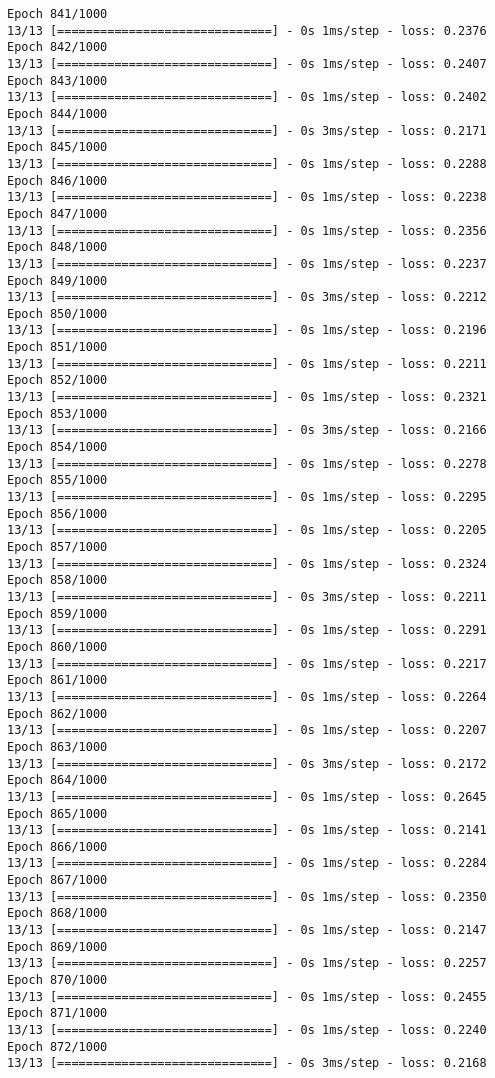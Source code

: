 \documentclass[11pt]{article}
\begin{document}
\begin{Verbatim}[commandchars=\\\{\}]
Epoch 841/1000
13/13 [==============================] - 0s 1ms/step - loss: 0.2376
Epoch 842/1000
13/13 [==============================] - 0s 1ms/step - loss: 0.2407
Epoch 843/1000
13/13 [==============================] - 0s 1ms/step - loss: 0.2402
Epoch 844/1000
13/13 [==============================] - 0s 3ms/step - loss: 0.2171
Epoch 845/1000
13/13 [==============================] - 0s 1ms/step - loss: 0.2288
Epoch 846/1000
13/13 [==============================] - 0s 1ms/step - loss: 0.2238
Epoch 847/1000
13/13 [==============================] - 0s 1ms/step - loss: 0.2356
Epoch 848/1000
13/13 [==============================] - 0s 1ms/step - loss: 0.2237
Epoch 849/1000
13/13 [==============================] - 0s 3ms/step - loss: 0.2212
Epoch 850/1000
13/13 [==============================] - 0s 1ms/step - loss: 0.2196
Epoch 851/1000
13/13 [==============================] - 0s 1ms/step - loss: 0.2211
Epoch 852/1000
13/13 [==============================] - 0s 1ms/step - loss: 0.2321
Epoch 853/1000
13/13 [==============================] - 0s 3ms/step - loss: 0.2166
Epoch 854/1000
13/13 [==============================] - 0s 1ms/step - loss: 0.2278
Epoch 855/1000
13/13 [==============================] - 0s 1ms/step - loss: 0.2295
Epoch 856/1000
13/13 [==============================] - 0s 1ms/step - loss: 0.2205
Epoch 857/1000
13/13 [==============================] - 0s 1ms/step - loss: 0.2324
Epoch 858/1000
13/13 [==============================] - 0s 3ms/step - loss: 0.2211
Epoch 859/1000
13/13 [==============================] - 0s 1ms/step - loss: 0.2291
Epoch 860/1000
13/13 [==============================] - 0s 1ms/step - loss: 0.2217
Epoch 861/1000
13/13 [==============================] - 0s 1ms/step - loss: 0.2264
Epoch 862/1000
13/13 [==============================] - 0s 1ms/step - loss: 0.2207
Epoch 863/1000
13/13 [==============================] - 0s 3ms/step - loss: 0.2172
Epoch 864/1000
13/13 [==============================] - 0s 1ms/step - loss: 0.2645
Epoch 865/1000
13/13 [==============================] - 0s 1ms/step - loss: 0.2141
Epoch 866/1000
13/13 [==============================] - 0s 1ms/step - loss: 0.2284
Epoch 867/1000
13/13 [==============================] - 0s 1ms/step - loss: 0.2350
Epoch 868/1000
13/13 [==============================] - 0s 1ms/step - loss: 0.2147
Epoch 869/1000
13/13 [==============================] - 0s 1ms/step - loss: 0.2257
Epoch 870/1000
13/13 [==============================] - 0s 1ms/step - loss: 0.2455
Epoch 871/1000
13/13 [==============================] - 0s 1ms/step - loss: 0.2240
Epoch 872/1000
13/13 [==============================] - 0s 3ms/step - loss: 0.2168

\end{Verbatim}
\end{document}
